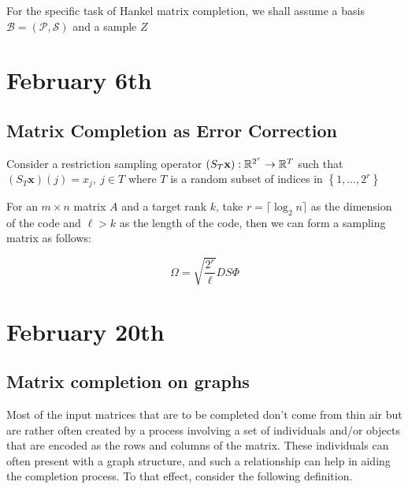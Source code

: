 \documentclass[12pt]{article}
\begin{document}
For the specific task of Hankel matrix completion, we shall assume a basis $\mathcal{B}= \left(\mathcal{P},\mathcal{S}\right)$ and a sample $Z$


\section{February 6th}

\subsection{Matrix Completion as Error Correction}

Consider a restriction sampling operator $(S_T\mathbf{x}):\mathbb{R}^{2^r}\rightarrow \mathbb{R}^T$ such that $(S_T\mathbf{x})(j) = x_j,\:j\in T$ where $T$ is a random subset of indices in $\left\{1,\dots, 2^r\right\}$

For an $m\times n$ matrix $A$ and a target rank $k$, take $r = \lceil \log_2{n} \rceil$ as the dimension of the code and $\ell > k$ as the length of the code, then we can form a sampling matrix as follows:

\begin{equation}
    \Omega = \sqrt{\frac{2^r}{\ell}}DS\Phi
\end{equation}

\section{February 20th}

\subsection{Matrix completion on graphs}


Most of the input matrices that are to be completed don't come from thin air but are rather often created by a process involving a set of individuals and/or objects that are encoded as the rows and columns of the matrix. These individuals can often present with a graph structure, and such a relationship can help in aiding the completion process. To that effect, consider the following definition.
\end{document}
